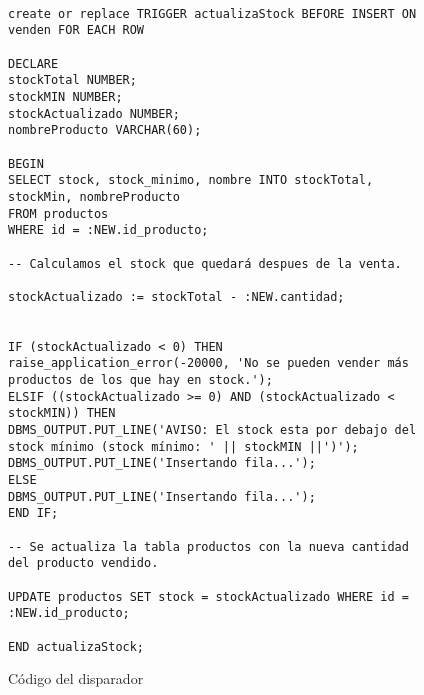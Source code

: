 \begin{figure}[H]
    \begin{tcolorbox}[sharp corners, colback=yellow!30, colframe=white!20]
        \tiny
        \begin{verbatim}

create or replace TRIGGER actualizaStock BEFORE INSERT ON venden FOR EACH ROW

DECLARE
stockTotal NUMBER;
stockMIN NUMBER;
stockActualizado NUMBER;
nombreProducto VARCHAR(60);

BEGIN
SELECT stock, stock_minimo, nombre INTO stockTotal, stockMin, nombreProducto
FROM productos
WHERE id = :NEW.id_producto;

-- Calculamos el stock que quedará despues de la venta.

stockActualizado := stockTotal - :NEW.cantidad;


IF (stockActualizado < 0) THEN
raise_application_error(-20000, 'No se pueden vender más productos de los que hay en stock.');
ELSIF ((stockActualizado >= 0) AND (stockActualizado < stockMIN)) THEN
DBMS_OUTPUT.PUT_LINE('AVISO: El stock esta por debajo del stock mínimo (stock mínimo: ' || stockMIN ||')');
DBMS_OUTPUT.PUT_LINE('Insertando fila...');
ELSE
DBMS_OUTPUT.PUT_LINE('Insertando fila...');
END IF;

-- Se actualiza la tabla productos con la nueva cantidad del producto vendido.

UPDATE productos SET stock = stockActualizado WHERE id = :NEW.id_producto;

END actualizaStock;
        \end{verbatim}
    \end{tcolorbox}
    \caption{Código del disparador}
\end{figure}

